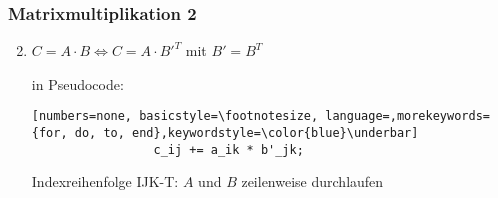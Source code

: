 \begin{frame} [fragile] \frametitle{Matrixmultiplikation 2}
	\begin{enumerate} \setcounter{enumi}{1}
	\item $C=A \cdot B \Leftrightarrow C=A \cdot B'^T$ mit $B'=B^T$
	\par in Pseudocode:
	\begin{lstlisting}[numbers=none, basicstyle=\footnotesize, language=,morekeywords={for, do, to, end},keywordstyle=\color{blue}\underbar]
		         c_ij += a_ik * b'_jk;
	\end{lstlisting}
	Indexreihenfolge IJK-T: $A$ und $B$ zeilenweise durchlaufen
	
	\end{enumerate}
\end{frame}

